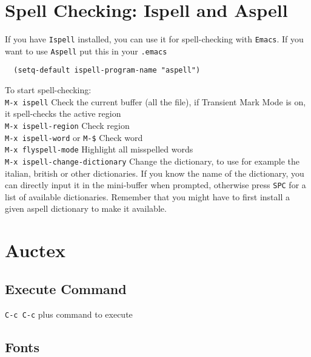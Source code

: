 \documentclass[a4paper,12pt]{report}
\begin{document}
\chapter{Spell Checking: Ispell and Aspell}
\label{chap:spellchecking}

If you have \texttt{Ispell} installed, you can use it for spell-checking with \texttt{Emacs}. If you want to use \texttt{Aspell} put this in your \texttt{.emacs}
\begin{verbatim}
  (setq-default ispell-program-name "aspell")
\end{verbatim}

To start spell-checking:\\

\texttt{M-x ispell} Check the current buffer (all the file), if Transient Mark Mode is on, it spell-checks the active region\\

\texttt{M-x ispell-region} Check region \\

\texttt{M-x ispell-word} or \texttt{M-\$} Check word \\

\texttt{M-x flyspell-mode} Highlight all misspelled words \\

\texttt{M-x ispell-change-dictionary} Change the dictionary, to use for example the italian, british or other dictionaries. If you know the name of the dictionary, you can directly input it in the mini-buffer when prompted, otherwise press \verb+SPC+ for a list of available dictionaries. Remember that you might have to first install a given aspell dictionary to make it available.\\



\chapter{Auctex}

\section{Execute Command}

\texttt{C-c C-c} plus command to execute \\

\section{Fonts}
\end{document}
